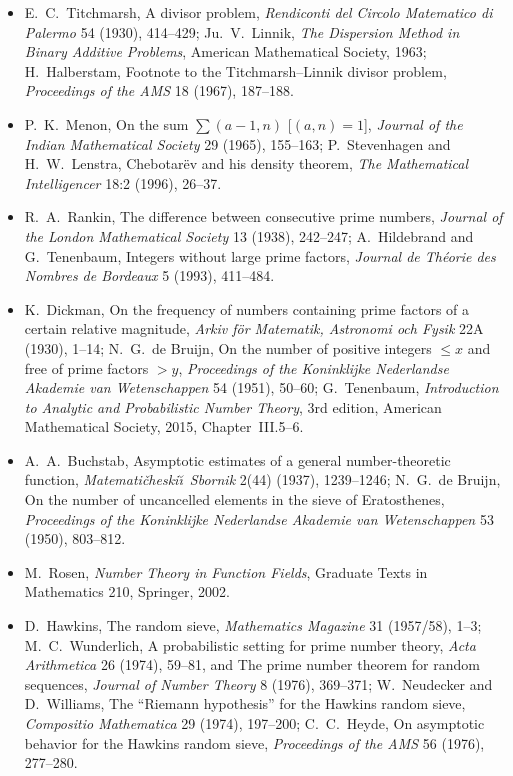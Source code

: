 \begin{itemize}
178--188; P.~Moree, Artin's primitive root conjecture, a survey, \emph{Integers} 12A (2012), A13.
\item E.~C.~Titchmarsh, A divisor problem, \emph{Rendiconti del Circolo Matematico di Palermo} 54 (1930), 414--429; Ju.~V.~Linnik, \emph{The Dispersion Method in Binary Additive Problems},
American Mathematical Society, 1963; H.~Halberstam, Footnote to the Titchmarsh--Linnik divisor problem, \emph{Proceedings of the AMS} 18 (1967), 187--188.
\item P.~K.~Menon, On the sum $\sum(a-1,n)$ [$(a,n)=1$], \emph{Journal of the Indian Mathematical Society} 29 (1965), 155--163; P.~Stevenhagen and H.~W.~Lenstra, Chebotar\"ev and his density theorem,
\emph{The Mathematical Intelligencer} 18:2 (1996), 26--37.
\item R.~A.~Rankin, The difference between consecutive prime numbers, \emph{Journal of the London Mathematical Society} 13 (1938), 242--247; A.~Hildebrand and G.~Tenenbaum, Integers without large prime
factors, \emph{Journal de Th\'eorie des Nombres de Bordeaux} 5 (1993), 411--484.
\item K.~Dickman, On the frequency of numbers containing prime factors of a certain relative magnitude, \emph{Arkiv f\"or Matematik, Astronomi och Fysik} 22A (1930), 1--14; N.~G.~de Bruijn,
On the number of positive integers $\le x$ and free of prime factors $>y$, \emph{Proceedings of the Koninklijke Nederlandse Akademie van Wetenschappen} 54 (1951), 50--60;
G.~Tenenbaum, \emph{Introduction to Analytic and Probabilistic Number Theory}, 3rd edition, American Mathematical Society, 2015, Chapter~III.5--6.
\item A.~A.~Buchstab, Asymptotic estimates of a general number-theoretic function, \emph{Matemati\v cheski\u\i\ Sbornik} 2(44) (1937), 1239--1246; N.~G.~de Bruijn, On the number of uncancelled elements in
the sieve of Eratosthenes, \emph{Proceedings of the Koninklijke Nederlandse Akademie van Wetenschappen} 53 (1950), 803--812.
\item M.~Rosen, \emph{Number Theory in Function Fields}, Graduate Texts in Mathematics 210, Springer, 2002.
\item D.~Hawkins, The random sieve, \emph{Mathematics Magazine} 31 (1957/58), 1--3; M.~C.~Wunderlich, A probabilistic setting for prime number theory, \emph{Acta Arithmetica} 26 (1974), 59--81, and
The prime number theorem for random sequences, \emph{Journal of Number Theory} 8 (1976), 369--371; W.~Neudecker and D.~Williams, The ``Riemann hypothesis'' for the Hawkins random sieve,
\emph{Compositio Mathematica} 29 (1974), 197--200; C.~C.~Heyde, On asymptotic behavior for the Hawkins random sieve, \emph{Proceedings of the AMS} 56 (1976), 277--280.

\end{itemize}

